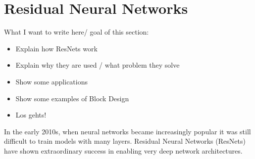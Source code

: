 \section{Residual Neural Networks}
\label{sec:neural-networks}

What I want to write here/ goal of this section:
\begin{itemize}
	\item Explain how ResNets work
	\item Explain why they are used / what problem they solve
	\item Show some applications
	\item Show some examples of Block Design
	\item Los gehts!
\end{itemize}

In the early 2010s, when neural networks became increasingly popular it was still difficult to train models with many layers.
Residual Neural Networks (ResNets) have shown extraordinary success in enabling very deep network architectures.